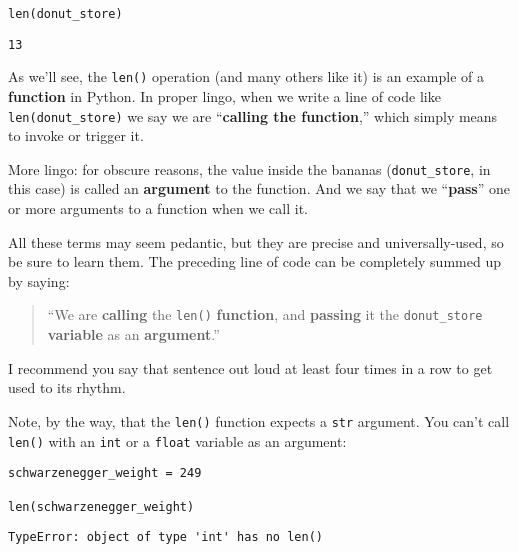 \begin{Verbatim}[fontsize=\small,samepage=true,frame=single,framesep=3mm]
len(donut_store)
\end{Verbatim}
\begin{Verbatim}[fontsize=\small,samepage=true,frame=leftline,framesep=5mm,framerule=1mm]
13
\end{Verbatim}

\label{function}
As we'll see, the \texttt{len()} operation (and many others like it) is an
example of a \textbf{function} in Python. In proper lingo, when we write a line
of code like \texttt{len(donut\_store)} we say we are ``\textbf{calling the
function},'' which simply means to invoke or trigger it.

More lingo: for obscure reasons, the value inside the bananas
(\texttt{donut\_store}, in this case) is called an \textbf{argument} to the
function. And we say that we ``\textbf{pass}'' one or more arguments to a
function when we call it.

All these terms may seem pedantic, but they are precise and universally-used,
so be sure to learn them. The preceding line of code can be completely summed
up by saying:

\begin{quote}
``We are \textbf{calling} the \texttt{len()} \textbf{function},
and \textbf{passing} it the \texttt{donut\_store} \textbf{variable} as an
\textbf{argument}.''
\end{quote}

I recommend you say that sentence out loud at least four times in a row to get
used to its rhythm.

Note, by the way, that the \texttt{len()} function expects a \texttt{str}
argument. You can't call \texttt{len()} with an \texttt{int} or a
\texttt{float} variable as an argument:

\begin{Verbatim}[fontsize=\small,samepage=true,frame=single,framesep=3mm]
schwarzenegger_weight = 249

len(schwarzenegger_weight)
\end{Verbatim}

\begin{Verbatim}[fontsize=\small,samepage=true,frame=leftline,framesep=5mm,framerule=1mm]
TypeError: object of type 'int' has no len()
\end{Verbatim}

